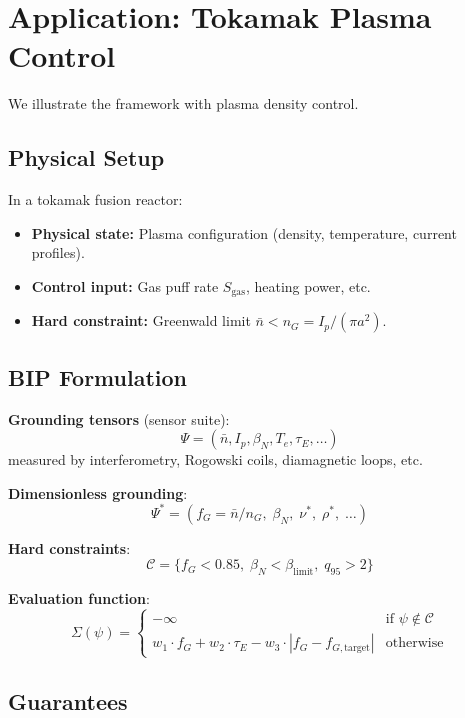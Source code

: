 \documentclass[11pt]{article}
\begin{document}
\section{Application: Tokamak Plasma Control}

We illustrate the framework with plasma density control.

\subsection{Physical Setup}

In a tokamak fusion reactor:
\begin{itemize}
    \item \textbf{Physical state:} Plasma configuration (density, temperature, current profiles).
    \item \textbf{Control input:} Gas puff rate $S_{\mathrm{gas}}$, heating power, etc.
    \item \textbf{Hard constraint:} Greenwald limit $\bar{n} < n_G = I_p/(\pi a^2)$.
\end{itemize}

\subsection{BIP Formulation}

\textbf{Grounding tensors} (sensor suite):
\[
\Psi = (\bar{n}, I_p, \beta_N, T_e, \tau_E, \ldots)
\]
measured by interferometry, Rogowski coils, diamagnetic loops, etc.

\textbf{Dimensionless grounding}:
\[
\Psi^* = (f_G = \bar{n}/n_G,\; \beta_N,\; \nu^*,\; \rho^*,\; \ldots)
\]

\textbf{Hard constraints}:
\[
\mathcal{C} = \{f_G < 0.85,\; \beta_N < \beta_{\mathrm{limit}},\; q_{95} > 2\}
\]

\textbf{Evaluation function}:
\[
\Sigma(\psi) = \begin{cases}
-\infty & \text{if } \psi \notin \mathcal{C} \\
w_1 \cdot f_G + w_2 \cdot \tau_E - w_3 \cdot |f_G - f_{G,\mathrm{target}}| & \text{otherwise}
\end{cases}
\]

\subsection{Guarantees}
\end{document}
